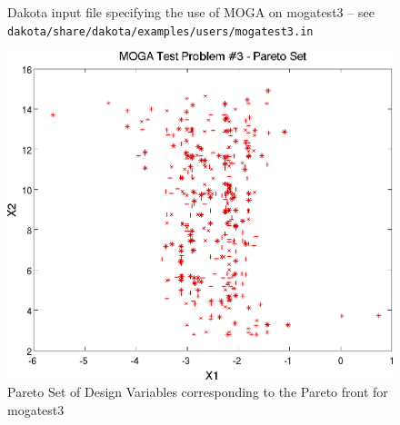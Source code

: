 \begin{figure}
  \centering
  \begin{bigbox}
    \begin{small}
    \end{small}
  \end{bigbox}
  \caption{Dakota input file specifying the use of MOGA on mogatest3 --
see \texttt{dakota/share/dakota/examples/users/mogatest3.in} }
  \label{additional:moga3inp}
\end{figure}

\begin{figure}
  \centering
  \includegraphics[scale=0.75]{images/dakota_mogatest3_pareto_set}
  \caption{Pareto Set of Design Variables corresponding to the Pareto
    front for mogatest3}
  \label{additional:moga3set}
\end{figure}


